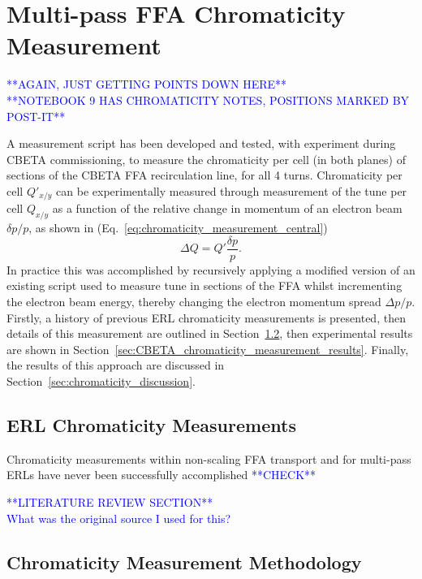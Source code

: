 \documentclass[../main.tex]{subfiles}
\begin{document}
\section{Multi-pass FFA Chromaticity Measurement}

\textcolor{blue}{**AGAIN, JUST GETTING POINTS DOWN HERE** \\ **NOTEBOOK 9 HAS CHROMATICITY NOTES, POSITIONS MARKED BY POST-IT**}

A measurement script has been developed and tested, with experiment during CBETA commissioning, to measure the chromaticity per cell (in both planes) of sections of the CBETA FFA recirculation line, for all 4 turns. Chromaticity per cell $Q'_{x/y}$ can be experimentally measured through measurement of the tune per cell $Q_{x/y}$ as a function of the relative change in momentum of an electron beam $\delta p/p$, as shown in (Eq.~\ref{eq:chromaticity_measurement_central})
\begin{equation}
\Delta Q = Q'\frac{\delta p}{p}.
\label{eq:chromaticity_measurement_central}
\end{equation}
In practice this was accomplished by recursively applying a modified version of an existing script used to measure tune in sections of the FFA whilst incrementing the electron beam energy, thereby changing the electron momentum spread $\Delta p/p$. Firstly, a history of previous ERL chromaticity measurements is presented, then details of this measurement are outlined in Section~\ref{sec:chromaticity_measurement_methodology}, then experimental results are shown in Section~\ref{sec:CBETA_chromaticity_measurement_results}. Finally, the results of this approach are discussed in Section~\ref{sec:chromaticity_discussion}. 

\subsection{ERL Chromaticity Measurements}
\label{sec:ERL_chromaticity_measurements}

Chromaticity measurements within non-scaling FFA transport and for multi-pass ERLs have never been successfully accomplished \textcolor{blue}{**CHECK**}

\textcolor{blue}{**LITERATURE REVIEW SECTION** \\ What was the original source I used for this? }

\subsection{Chromaticity Measurement Methodology}
\label{sec:chromaticity_measurement_methodology}
\end{document}
